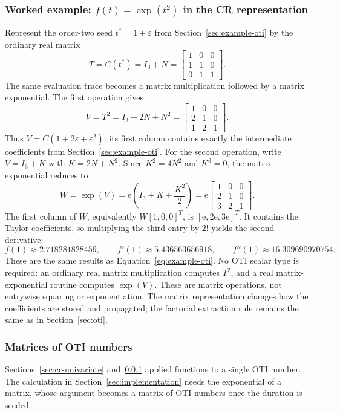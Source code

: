 \documentclass[10pt]{article}
\begin{document}
\subsubsection{Worked example: \texorpdfstring{$f(t)=\exp(t^2)$}{f(t) = exp(t squared)} in the CR representation}
\label{sec:example-cr}
Represent the order-two seed $t^*=1+\varepsilon$ from
Section~\ref{sec:example-oti} by the ordinary real matrix
\[
 T=C(t^*)=I_3+N=
 \begin{bmatrix}1&0&0\\1&1&0\\0&1&1\end{bmatrix}.
\]
The same evaluation trace becomes a matrix multiplication followed by a matrix
exponential. The first operation gives
\[
 V=T^2=I_3+2N+N^2=
 \begin{bmatrix}1&0&0\\2&1&0\\1&2&1\end{bmatrix}.
\]
Thus $V=C(1+2\varepsilon+\varepsilon^2)$: its first column contains exactly
the intermediate coefficients from Section~\ref{sec:example-oti}.
For the second operation, write $V=I_3+K$ with $K=2N+N^2$.
Since $K^2=4N^2$ and $K^3=0$, the matrix exponential reduces to
\begin{equation}
\label{eq:example-cr}
 W=\exp(V)=\mathrm e\left(I_3+K+\frac{K^2}{2}\right)
 =\mathrm e\begin{bmatrix}1&0&0\\2&1&0\\3&2&1\end{bmatrix}.
\end{equation}
The first column of $W$, equivalently $W[1,0,0]^T$, is
$[\mathrm e,2\mathrm e,3\mathrm e]^T$. It contains the Taylor coefficients,
so multiplying the third entry by $2!$ yields the second derivative:
\[
 f(1)\approx2.718281828459,\qquad
 f'(1)\approx5.436563656918,\qquad
 f''(1)\approx16.309690970754.
\]
These are the same results as Equation~\eqref{eq:example-oti}. No OTI scalar type
is required: an ordinary real matrix multiplication computes $T^2$, and a real
matrix-exponential routine computes $\exp(V)$. These are matrix operations,
not entrywise squaring or exponentiation. The matrix representation changes
how the coefficients are stored and propagated; the factorial extraction rule
remains the same as in Section~\ref{sec:oti}.

\subsubsection{Matrices of OTI numbers}
\label{sec:cr-matrices}
Sections~\ref{sec:cr-univariate} and~\ref{sec:example-cr} applied functions to a
single OTI number. The calculation in Section~\ref{sec:implementation} needs the
exponential of a matrix, whose argument becomes a matrix of OTI numbers once the
duration is seeded.
\end{document}
